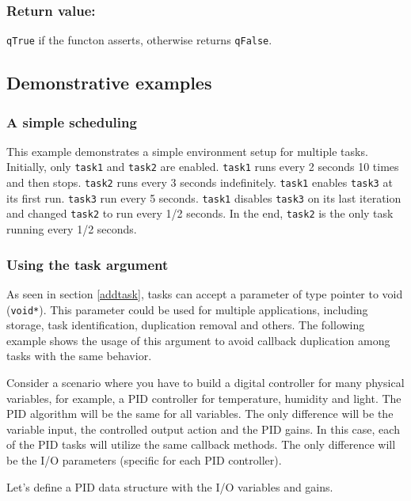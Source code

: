 \subsubsection*{Return value:}
\lstinline{qTrue} if the functon asserts, otherwise returns \lstinline{qFalse}.

\subsection{Demonstrative examples}
\subsubsection{A simple scheduling}
This example demonstrates a simple environment setup for multiple tasks. Initially, only \lstinline{task1} and \lstinline{task2} are enabled. \lstinline{task1} runs every 2 seconds 10 times and then stops. \lstinline{task2} runs every 3 seconds indefinitely. \lstinline{task1} enables \lstinline{task3} at its first run. \lstinline{task3} run every 5 seconds. \lstinline{task1} disables \lstinline{task3} on its last iteration and changed \lstinline{task2} to run every 1/2 seconds. In the end, \lstinline{task2} is the only task running every 1/2 seconds.
\medskip



\subsubsection{Using the task argument}
As seen in section \ref{addtask}, tasks can accept a parameter of type pointer to void (\lstinline{void*}). 
This parameter could be used for multiple applications, including storage, task identification, duplication removal and others. The following example shows the usage of this argument to avoid callback duplication among tasks with the same behavior. 

Consider a scenario where you have to build a digital controller for many physical variables, for example, a PID controller for temperature, humidity and light. The PID algorithm will be the same for all variables. The only difference will be the variable input, the controlled output action and the PID gains. In this case, each of the PID tasks will utilize the same callback methods. The only difference will be the I/O parameters (specific for each PID controller). 
\medskip

Let's define a PID data structure with the I/O variables and gains.
\medskip
 
